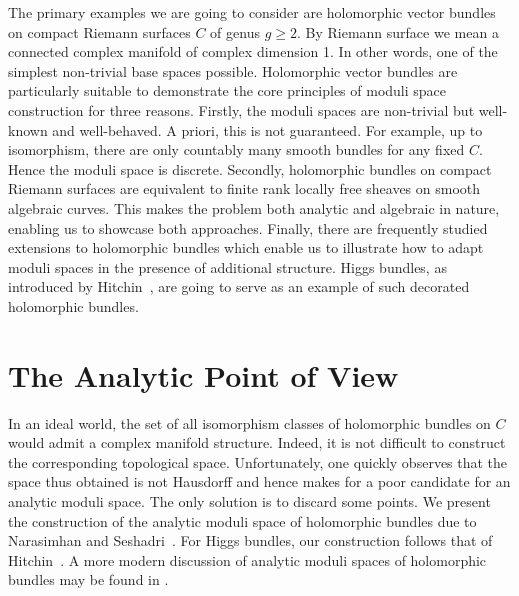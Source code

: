 \documentclass[12pt]{ociamthesis}  %
\begin{document}
The primary examples we are going to consider are holomorphic
vector bundles on compact Riemann surfaces $C$ of genus $g\geq 2$. By Riemann surface
we mean a connected complex manifold of complex dimension 1. In other words,
one of the simplest non-trivial base spaces possible. Holomorphic vector
bundles are particularly suitable to demonstrate the core principles
of moduli space construction
for three reasons. Firstly, the moduli spaces are non-trivial but
well-known and well-behaved. A priori, this is not guaranteed. For
example, up to isomorphism, there are only countably
many smooth bundles for any fixed $C$. Hence the moduli space is
discrete. Secondly, holomorphic bundles on compact Riemann surfaces are equivalent
to finite rank locally free sheaves on smooth algebraic curves. This
makes the problem both analytic and algebraic in nature, enabling
us to showcase both approaches.
Finally, there are frequently studied extensions to holomorphic
bundles which enable us to illustrate how to adapt moduli spaces in the
presence of additional structure. Higgs bundles, as introduced by
Hitchin~\cite{hitchin1987}, are going to serve as an example
of such decorated holomorphic bundles.

\section{The Analytic Point of View}

In an ideal world, the set of all isomorphism classes of holomorphic bundles
on $C$ would admit a complex manifold structure. Indeed, it is not difficult
to construct the corresponding topological space. Unfortunately, one
quickly observes that the space thus obtained is not Hausdorff and hence
makes for a poor candidate for an analytic moduli space.
The only solution is to discard some points. We present
the construction of the analytic moduli space of holomorphic bundles
due to Narasimhan and Seshadri~\cite{ns1964}. For Higgs bundles, our
construction follows that of Hitchin~\cite{hitchin1987}.
A more modern discussion of analytic moduli spaces of holomorphic
bundles may be found in \cite{kobayashi1987}.
\end{document}

